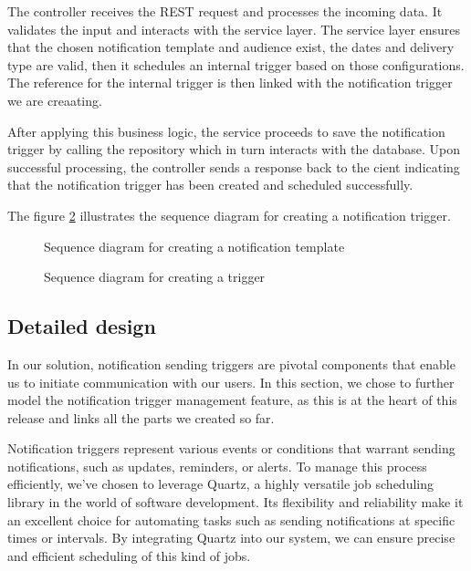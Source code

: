 The controller receives the REST request and processes the incoming data. It validates the input
and interacts with the service layer. The service layer ensures that the chosen notification template and
audience exist, the dates and delivery type are valid, then it schedules an internal trigger based on those
configurations. The reference for the internal trigger is then linked with the notification trigger we are
creaating.

After applying this business logic, the service proceeds to save the notification trigger by calling
the repository which in turn interacts with the database. Upon successful processing, the controller sends
a response back to the cient indicating that the notification trigger has been created and scheduled successfully.

\noindent The figure \ref{seq-create-trigger} illustrates the sequence diagram for creating a notification trigger.

\begin{landscape}
    \begin{figure}[hbt!]
        \centering
        
        \caption{Sequence diagram for creating a notification template}
        \label{seq-create-template}
    \end{figure}
\end{landscape}

\begin{landscape}
    \begin{figure}[hbt!]
        \centering
        
        \caption{Sequence diagram for creating a trigger}
        \label{seq-create-trigger}
    \end{figure}
\end{landscape}


\subsection{Detailed design}
In our solution, notification sending triggers are pivotal components that enable us to initiate
communication with our users. In this section, we chose to further model the notification trigger
management feature, as this is at the heart of this release and links all the parts we created so far.

Notification triggers represent various events or conditions that warrant sending notifications,
such as updates, reminders, or alerts. To manage this process efficiently, we've chosen to leverage
Quartz, a highly versatile job scheduling library in the world of software development.
Its flexibility and reliability make it an excellent choice for automating tasks such as sending
notifications at specific times or intervals. By integrating Quartz into our system, we can ensure
precise and efficient scheduling of this kind of jobs.

